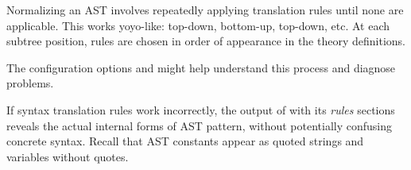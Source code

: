 \begin{isabellebody}
\begin{isamarkuptext}
  Normalizing an AST involves repeatedly applying translation rules
  until none are applicable.  This works yoyo-like: top-down,
  bottom-up, top-down, etc.  At each subtree position, rules are
  chosen in order of appearance in the theory definitions.

  The configuration options \hyperlink{attribute.syntax-ast-trace}{\mbox{}} and
  \hyperlink{attribute.syntax-ast-stats}{\mbox{}} might help understand this process
  and diagnose problems.

  \begin{warn}
  If syntax translation rules work incorrectly, the output of
  \hyperlink{command.print-syntax}{\mbox{}} with its \emph{rules} sections reveals the
  actual internal forms of AST pattern, without potentially confusing
  concrete syntax.  Recall that AST constants appear as quoted strings
  and variables without quotes.
  \end{warn}


\end{isamarkuptext}
\end{isabellebody}
